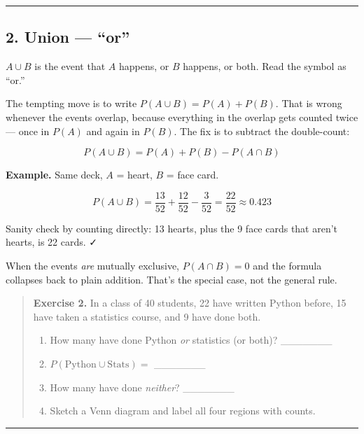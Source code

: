\documentclass[
]{article}
\providecommand{\tightlist}{%
  \setlength{\itemsep}{0pt}\setlength{\parskip}{0pt}}
\begin{document}
\begin{center}\rule{0.5\linewidth}{0.5pt}\end{center}

\subsection{\texorpdfstring{2. Union ---
``\textbf{or}''}{2. Union --- ``or''}}\label{union-or}

\(A \cup B\) is the event that \(A\) happens, or \(B\) happens, or both.
Read the symbol as ``or.''

The tempting move is to write \(P(A \cup B) = P(A) + P(B)\). That is
wrong whenever the events overlap, because everything in the overlap
gets counted twice --- once in \(P(A)\) and again in \(P(B)\). The fix
is to subtract the double-count:

\[P(A \cup B) = P(A) + P(B) - P(A \cap B)\]

\textbf{Example.} Same deck, \(A\) = heart, \(B\) = face card.

\[P(A \cup B) = \frac{13}{52} + \frac{12}{52} - \frac{3}{52} = \frac{22}{52} \approx 0.423\]

Sanity check by counting directly: 13 hearts, plus the 9 face cards that
aren't hearts, is 22 cards. ✓

When the events \emph{are} mutually exclusive, \(P(A \cap B) = 0\) and
the formula collapses back to plain addition. That's the special case,
not the general rule.

\begin{quote}
\textbf{Exercise 2.} In a class of 40 students, 22 have written Python
before, 15 have taken a statistics course, and 9 have done both.

\begin{enumerate}
\def\labelenumi{(\alph{enumi})}
\tightlist
\item
  How many have done Python \emph{or} statistics (or both)?
  \_\_\_\_\_\_\_
\item
  \(P(\text{Python} \cup \text{Stats})=\) \_\_\_\_\_\_\_
\item
  How many have done \emph{neither}? \_\_\_\_\_\_\_
\item
  Sketch a Venn diagram and label all four regions with counts.
\end{enumerate}
\end{quote}

\begin{center}\rule{0.5\linewidth}{0.5pt}\end{center}
\end{document}
